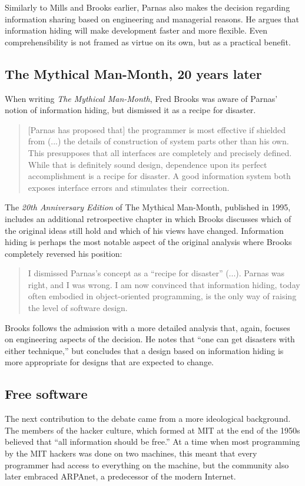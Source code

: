 Similarly to Mills and Brooks earlier, Parnas also makes the decision regarding information
sharing based on engineering and managerial reasons. He argues that information hiding will
make development faster and more flexible. Even comprehensibility is not framed as virtue on
its own, but as a practical benefit.

\subsection{The Mythical Man-Month, 20 years later}
When writing \emph{The Mythical Man-Month}, Fred Brooks was aware of Parnas' notion of information
hiding, but dismissed it as a recipe for disaster.

\begin{quote}
[Parnas has proposed that] the programmer is most effective if shielded from (...)
the details of construction of system parts other than his own. This presupposes
that all interfaces are completely and precisely defined. While that is definitely sound design,
dependence upon its perfect accomplishment is a recipe for disaster. A good information
system both exposes interface errors and stimulates their~correction.
\end{quote}

The \emph{20th Anniversary Edition} of The Mythical Man-Month, published in 1995, includes
an additional retrospective chapter in which Brooks discusses which of the original ideas
still hold and which of his views have changed. Information hiding is perhaps the most notable
aspect of the original analysis where Brooks completely reversed his position:

\begin{quote}
I dismissed Parnas's concept as a ``recipe for disaster'' (...). Parnas was right, and I
was wrong. I am now convinced that information hiding, today often embodied in
object-oriented programming, is the only way of raising the level of software
design.
\end{quote}

Brooks follows the admission with a more detailed analysis that, again, focuses on
engineering aspects of the decision. He notes that ``one can get disasters with either
technique,'' but concludes that a design based on information hiding is more appropriate
for designs that are expected to change.

\subsection{Free software}
The next contribution to the debate came from a more ideological
background. The members of the hacker culture, which formed at MIT at the end of the
1950s believed that ``all information should be free.''
At a time when most programming by the MIT hackers was done on two machines, this
meant that every programmer had access to everything on the machine, but the community also
later embraced ARPAnet, a predecessor of the modern Internet.

